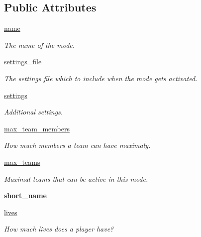 \subsection*{\-Public \-Attributes}
\begin{DoxyCompactItemize}
\item 
\hyperlink{class_mode_1_1_mode_a22d3bd9cd7813368ddc9776639e1858b}{name}
\begin{DoxyCompactList}\small\item\em \-The name of the mode. \end{DoxyCompactList}\item 
\hyperlink{class_mode_1_1_mode_a83b66f5529079e8d1b9c6512935de32a}{settings\-\_\-file}
\begin{DoxyCompactList}\small\item\em \-The settings file which to include when the mode gets activated. \end{DoxyCompactList}\item 
\hyperlink{class_mode_1_1_mode_a25aef866f99b51dd7f350bac9d3b4e2e}{settings}
\begin{DoxyCompactList}\small\item\em \-Additional settings. \end{DoxyCompactList}\item 
\hyperlink{class_mode_1_1_mode_a78777948faad5bc1cdfe9af5b2319bac}{max\-\_\-team\-\_\-members}
\begin{DoxyCompactList}\small\item\em \-How much members a team can have maximaly. \end{DoxyCompactList}\item 
\hyperlink{class_mode_1_1_mode_aecd7840424d68b82a21065ed629617bd}{max\-\_\-teams}
\begin{DoxyCompactList}\small\item\em \-Maximal teams that can be active in this mode. \end{DoxyCompactList}\item 
\hypertarget{class_mode_1_1_mode_a2aa16f8b971441e63ac477717b57bc86}{
{\bfseries short\-\_\-name}}
\label{class_mode_1_1_mode_a2aa16f8b971441e63ac477717b57bc86}

\item 
\hyperlink{class_mode_1_1_mode_a323bce82bf2ed29d058891f084551c0e}{lives}
\begin{DoxyCompactList}\small\item\em \-How much lives does a player have? \end{DoxyCompactList}\end{DoxyCompactItemize}
